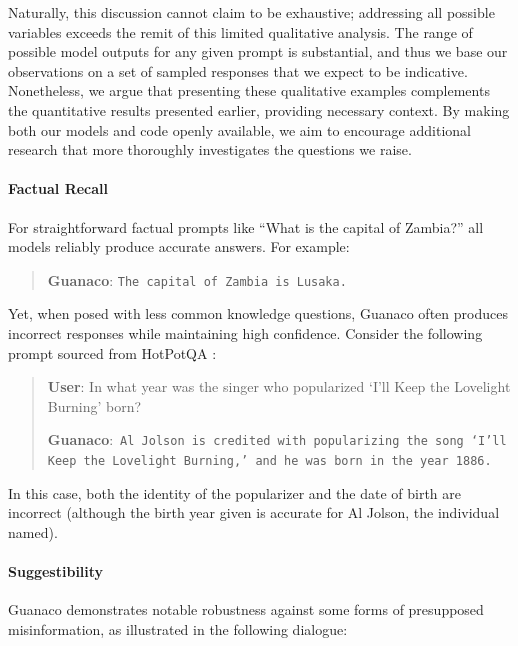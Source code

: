Naturally, this discussion cannot claim to be exhaustive; addressing all possible variables exceeds the remit of this limited qualitative analysis. The range of possible model outputs for any given prompt is substantial, and thus we base our observations on a set of sampled responses that we expect to be indicative. Nonetheless, we argue that presenting these qualitative examples complements the quantitative results presented earlier, providing necessary context. By making both our models and code openly available, we aim to encourage additional research that more thoroughly investigates the questions we raise.

\paragraph{Factual Recall} For straightforward factual prompts like ``What is the capital of Zambia?'' all models reliably produce accurate answers. For example:

\begin{quote} 
    \textbf{Guanaco}:
    \texttt{The capital of Zambia is Lusaka.}
\end{quote}

Yet, when posed with less common knowledge questions, {Guanaco} often produces incorrect responses while maintaining high confidence. Consider the following prompt sourced from HotPotQA \citep{yang2018hotpotqa}:

\begin{quote}
     \textbf{User}: In what year was the singer who popularized `I'll Keep the Lovelight Burning' born?  

     \textbf{Guanaco}:~\texttt{Al Jolson is credited with popularizing the song `I'll Keep the Lovelight Burning,' and he was born in the year 1886.}
 \end{quote}

In this case, both the identity of the popularizer and the date of birth are incorrect (although the birth year given is accurate for Al Jolson, the individual named).

\paragraph{Suggestibility} {Guanaco} demonstrates notable robustness against some forms of presupposed misinformation, as illustrated in the following dialogue:

